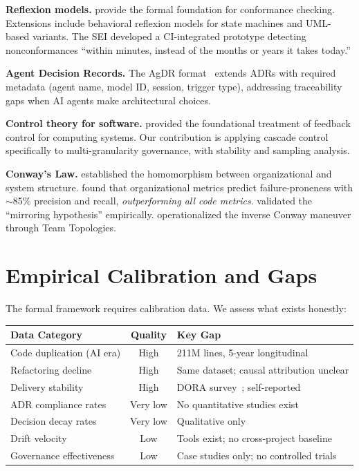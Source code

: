 \documentclass[11pt, a4paper, copyright]{googledeepmind}
\begin{document}
\textbf{Reflexion models.} \citet{murphy1995, murphy2001} provide the formal foundation for conformance checking. Extensions include behavioral reflexion models for state machines and UML-based variants. The SEI developed a CI-integrated prototype detecting nonconformances ``within minutes, instead of the months or years it takes today.''

\textbf{Agent Decision Records.} The AgDR format~\citep{agdr} extends ADRs with required metadata (agent name, model ID, session, trigger type), addressing traceability gaps when AI agents make architectural choices.

\textbf{Control theory for software.} \citet{hellerstein2004} provided the foundational treatment of feedback control for computing systems. Our contribution is applying cascade control specifically to multi-granularity governance, with stability and sampling analysis.

\textbf{Conway's Law.} \citet{conway1968} established the homomorphism between organizational and system structure. \citet{nagappan2008} found that organizational metrics predict failure-proneness with $\sim$85\% precision and recall, \emph{outperforming all code metrics}. \citet{maccormack2008} validated the ``mirroring hypothesis'' empirically. \citet{skelton2019} operationalized the inverse Conway maneuver through Team Topologies.


\section{Empirical Calibration and Gaps}
\label{sec:gaps}

The formal framework requires calibration data. We assess what exists honestly:

\begin{center}
\begin{tabular}{lcp{6cm}}
\toprule
Data Category & Quality & Key Gap \\
\midrule
Code duplication (AI era) & High & 211M lines, 5-year longitudinal~\citep{gitclear2025} \\
Refactoring decline & High & Same dataset; causal attribution unclear \\
Delivery stability & High & DORA survey~\citep{dora2025}; self-reported \\
ADR compliance rates & Very low & No quantitative studies exist \\
Decision decay rates & Very low & Qualitative only \\
Drift velocity & Low & Tools exist; no cross-project baseline \\
Governance effectiveness & Low & Case studies only; no controlled trials \\
\bottomrule
\end{tabular}
\end{center}
\end{document}
